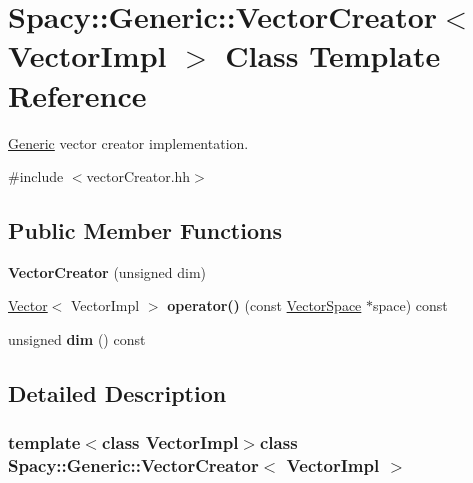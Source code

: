 \hypertarget{classSpacy_1_1Generic_1_1VectorCreator}{\section{\-Spacy\-:\-:\-Generic\-:\-:\-Vector\-Creator$<$ \-Vector\-Impl $>$ \-Class \-Template \-Reference}
\label{classSpacy_1_1Generic_1_1VectorCreator}
}


\hyperlink{namespaceSpacy_1_1Generic}{\-Generic} vector creator implementation.  




{\ttfamily \#include $<$vector\-Creator.\-hh$>$}

\subsection*{\-Public \-Member \-Functions}
\begin{DoxyCompactItemize}
\item 
\hypertarget{classSpacy_1_1Generic_1_1VectorCreator_a19fcd1bd6edb602294cf1c1eedc64c55}{{\bfseries \-Vector\-Creator} (unsigned dim)}\label{classSpacy_1_1Generic_1_1VectorCreator_a19fcd1bd6edb602294cf1c1eedc64c55}

\item 
\hypertarget{classSpacy_1_1Generic_1_1VectorCreator_ad394c7a64f4270c89e13af1f75649ad9}{\hyperlink{classSpacy_1_1Generic_1_1Vector}{\-Vector}$<$ \-Vector\-Impl $>$ {\bfseries operator()} (const \hyperlink{classSpacy_1_1VectorSpace}{\-Vector\-Space} $\ast$space) const }\label{classSpacy_1_1Generic_1_1VectorCreator_ad394c7a64f4270c89e13af1f75649ad9}

\item 
\hypertarget{classSpacy_1_1Generic_1_1VectorCreator_a1f1e7616f7319b511655873eed442088}{unsigned {\bfseries dim} () const }\label{classSpacy_1_1Generic_1_1VectorCreator_a1f1e7616f7319b511655873eed442088}

\end{DoxyCompactItemize}


\subsection{\-Detailed \-Description}
\subsubsection*{template$<$class Vector\-Impl$>$class Spacy\-::\-Generic\-::\-Vector\-Creator$<$ Vector\-Impl $>$}

